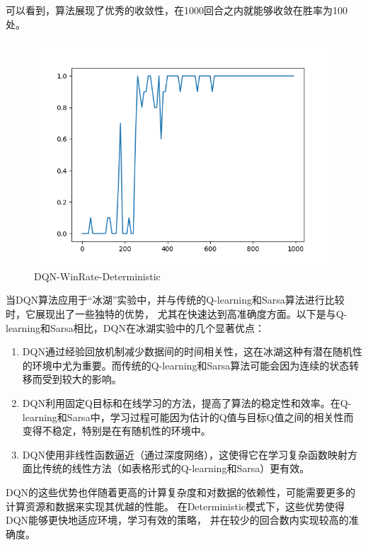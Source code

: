 \documentclass{thuemp}
\begin{document}
可以看到，算法展现了优秀的收敛性，在1000回合之内就能够收敛在胜率为100处。
\begin{figure}[H]
  \centering
  \includegraphics[width=1\linewidth]{./img/result/dqn/dqn-winRate.png}
  \caption{DQN-WinRate-Deterministic}
\end{figure}
当DQN算法应用于“冰湖”实验中，并与传统的Q-learning和Sarsa算法进行比较时，它展现出了一些独特的优势，
尤其在快速达到高准确度方面。以下是与Q-learning和Sarsa相比，DQN在冰湖实验中的几个显著优点：

\begin{enumerate}
  \item DQN通过经验回放机制减少数据间的时间相关性，这在冰湖这种有潜在随机性的环境中尤为重要。而传统的Q-learning和Sarsa算法可能会因为连续的状态转移而受到较大的影响。
  \item DQN利用固定Q目标和在线学习的方法，提高了算法的稳定性和效率。在Q-learning和Sarsa中，学习过程可能因为估计的Q值与目标Q值之间的相关性而变得不稳定，特别是在有随机性的环境中。
  \item DQN使用非线性函数逼近（通过深度网络），这使得它在学习复杂函数映射方面比传统的线性方法（如表格形式的Q-learning和Sarsa）更有效。
\end{enumerate}

DQN的这些优势也伴随着更高的计算复杂度和对数据的依赖性，可能需要更多的计算资源和数据来实现其优越的性能。
在Deterministic模式下，这些优势使得DQN能够更快地适应环境，学习有效的策略，
并在较少的回合数内实现较高的准确度。
\end{document}
